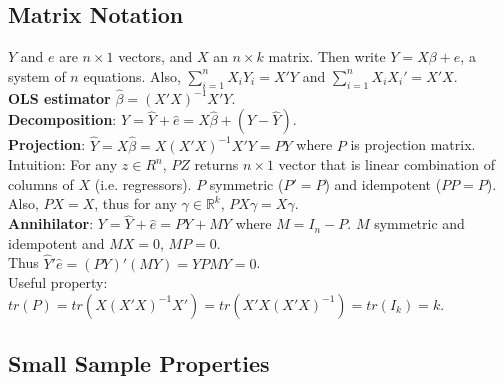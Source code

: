 \subsection{Matrix Notation}
$Y$ and $e$ are $n\times1$ vectors, and $X$ an $n\times k$ matrix. Then write $Y = X\beta + e$, a system of $n$ equations. Also, $\sum_{i=1}^n X_iY_i = X'Y$ and $\sum_{i=1}^n X_iX_i' = X'X$.\\
\textbf{OLS estimator} $\hat{\beta} = (X'X)^{-1}X'Y$.\\
\textbf{Decomposition}: $Y = \hat{Y} + \hat{e} = X\hat{\beta} + (Y - \hat{Y})$.\\
\textbf{Projection}: $\hat{Y} = X\hat{\beta} = X(X'X)^{-1}X'Y = PY$ where $P$ is projection matrix.\\
Intuition: For any $z\in R^n$, $PZ$ returns $n\times 1$ vector that is linear combination of columns of $X$ (i.e. regressors). $P$ symmetric ($P'=P$) and idempotent ($PP=P$). Also, $PX = X$, thus for any $\gamma \in \mathbb{R}^k$, $PX\gamma = X\gamma$.\\
\textbf{Annihilator}: $Y = \hat{Y} + \hat{e} = PY + MY$ where $M = I_n - P$. $M$ symmetric and idempotent and $MX = 0$, $MP = 0$.\\
Thus $\hat{Y}'\hat{e} = (PY)'(MY) = YPMY = 0$.\\
Useful property: $tr(P) = tr(X(X'X)^{-1}X') = tr(X'X(X'X)^{-1}) = tr(I_k) = k$.

\subsection{Small Sample Properties}
